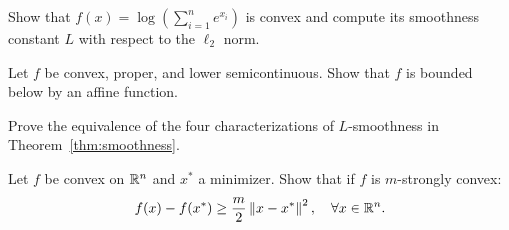 \begin{exercise}[$\star\star$]
Show that $f(x) = \log\left(\sum_{i=1}^n e^{x_i}\right)$ is convex and compute its
smoothness constant $L$ with respect to the $\ell_2$ norm.
\end{exercise}

\begin{exercise}[$\star\star$]
Let $f$ be convex, proper, and lower semicontinuous. Show that $f$ is bounded below
by an affine function.
\end{exercise}

\begin{exercise}[$\star\star\star$]
Prove the equivalence of the four characterizations of $L$-smoothness in
Theorem~\ref{thm:smoothness}.
\end{exercise}

\begin{exercise}[$\star\star\star$]
Let $f$ be convex on $\mathbb{R}^n$ and $x^*$ a minimizer. Show that if $f$ is $m$-strongly
convex:
\[
    f(x) - f(x^*) \geq \frac{m}{2}\left\| x - x^* \right\|^2, \quad \forall x \in \mathbb{R}^n.
\]
\end{exercise}
